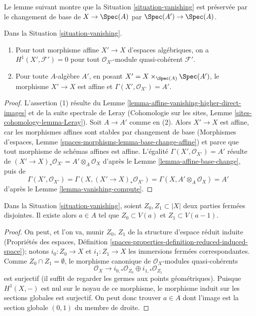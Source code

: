 \noindent
Le lemme suivant montre que la Situation \ref{situation-vanishing}
est préservée par le changement de base de $X \to \Spec(A)$ par $\Spec(A') \to \Spec(A)$.

\begin{lemma}
\label{lemma-vanishing-base-change}
Dans la Situation \ref{situation-vanishing}.
\begin{enumerate}
\item Pour tout morphisme affine $X' \to X$ d'espaces algébriques, on a
$H^1(X', \mathcal{F}') = 0$ pour tout
$\mathcal{O}_{X'}$-module quasi-cohérent $\mathcal{F}'$.
\item Pour toute $A$-algèbre $A'$, en posant $X' = X \times_{\Spec(A)} \Spec(A')$,
le morphisme $X' \to X$ est affine et $\Gamma(X', \mathcal{O}_{X'}) = A'$.
\end{enumerate}
\end{lemma}

\begin{proof}
L'assertion (1) résulte du Lemme \ref{lemma-affine-vanishing-higher-direct-images}
et de la suite spectrale de Leray (Cohomologie sur les sites, Lemme
\ref{sites-cohomology-lemma-Leray}). Soit $A \to A'$ comme en (2).
Alors $X' \to X$ est affine, car les morphismes affines sont stables par
changement de base (Morphismes d'espaces, Lemme
\ref{spaces-morphisms-lemma-base-change-affine}) et parce que
tout morphisme de schémas affines est affine. L'égalité
$\Gamma(X', \mathcal{O}_{X'}) = A'$ résulte de
$(X' \to X)_*\mathcal{O}_{X'} = A' \otimes_A \mathcal{O}_X$
d'après le Lemme \ref{lemma-affine-base-change}, puis de
$$
\Gamma(X', \mathcal{O}_{X'}) =
\Gamma(X, (X' \to X)_*\mathcal{O}_{X'}) =
\Gamma(X, A' \otimes_A \mathcal{O}_X) = A'
$$
d'après le Lemme \ref{lemma-vanishing-compute}.
\end{proof}

\begin{lemma}
\label{lemma-vanishing-separate-closed}
Dans la Situation \ref{situation-vanishing}, soient $Z_0, Z_1 \subset |X|$
deux parties fermées disjointes. Il existe alors $a \in A$ tel que
$Z_0 \subset V(a)$ et $Z_1 \subset V(a - 1)$.
\end{lemma}

\begin{proof}
On peut, et l'on va, munir $Z_0$, $Z_1$ de la structure d'espace réduit induite
(Propriétés des espaces, Définition
\ref{spaces-properties-definition-reduced-induced-space}); notons
$i_0 : Z_0 \to X$ et $i_1 : Z_1 \to X$ les immersions fermées correspondantes.
Comme $Z_0 \cap Z_1 = \emptyset$, le morphisme canonique de
$\mathcal{O}_X$-modules quasi-cohérents
$$
\mathcal{O}_X
\longrightarrow
i_{0, *}\mathcal{O}_{Z_0} \oplus i_{1, *}\mathcal{O}_{Z_1}
$$
est surjectif (il suffit de regarder les germes aux points géométriques). Puisque $H^1(X, -)$
est nul sur le noyau de ce morphisme, le morphisme induit sur les sections globales est
surjectif. On peut donc trouver $a \in A$ dont l'image est la section globale
$(0, 1)$ du membre de droite.
\end{proof}

